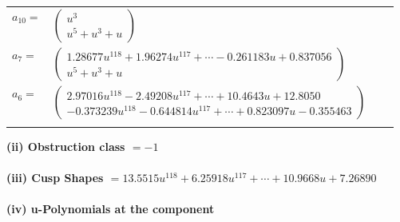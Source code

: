 \documentclass[1p]{elsarticle_modified}
\theoremstyle{definition}
\begin{document}
\begin{tabular}{m{7pt} m{180pt} m{7pt} m{180pt} }
\flushright $a_{10}=$&$\begin{pmatrix}u^3\\u^5+u^3+u\end{pmatrix}$ \\
\flushright $a_{7}=$&$\begin{pmatrix}1.28677 u^{118}+1.96274 u^{117}+\cdots-0.261183 u+0.837056\\u^5+u^3+u\end{pmatrix}$ \\
\flushright $a_{6}=$&$\begin{pmatrix}2.97016 u^{118}-2.49208 u^{117}+\cdots+10.4643 u+12.8050\\-0.373239 u^{118}-0.644814 u^{117}+\cdots+0.823097 u-0.355463\end{pmatrix}$\\&\end{tabular}
\flushleft \textbf{(ii) Obstruction class $= -1$}\\~\\
\flushleft \textbf{(iii) Cusp Shapes $= 13.5515 u^{118}+6.25918 u^{117}+\cdots+10.9668 u+7.26890$}\\~\\
\newpage\renewcommand{\arraystretch}{1}
\flushleft \textbf{(iv) u-Polynomials at the component}\newline \\
\end{document}
